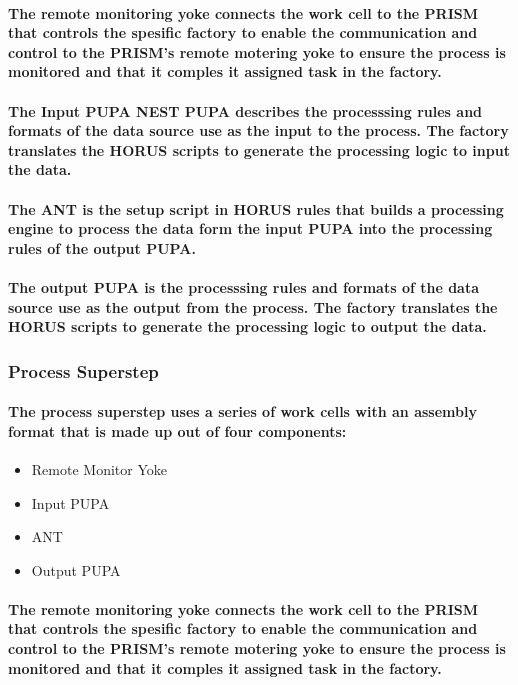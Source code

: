 \documentclass{acm_proc_article-sp}
\begin{document}
\paragraph{The remote monitoring yoke connects the work cell to the PRISM that controls the spesific factory to enable the communication and control to the PRISM's remote motering yoke to ensure the process is monitored and that it comples it assigned task in the factory.}
\paragraph{The Input PUPA NEST PUPA describes the processsing rules and formats of the data source use as the input to the process. The factory translates the HORUS scripts to generate the processing logic to input the data.}
\paragraph{The ANT is the setup script in HORUS rules that builds a processing engine to process the data form the input PUPA into the processing rules of the output PUPA. }
\paragraph{The output PUPA is the processsing rules and formats of the data source use as the output from the process. The factory translates the HORUS scripts to generate the processing logic to output the data.}
\subsubsection{Process Superstep}
\paragraph{The process superstep uses a series of work cells with an assembly format that is made up out of four components:}
\begin{itemize}
\item{Remote Monitor Yoke}
\item{Input PUPA}
\item{ANT}
\item{Output PUPA}
\end{itemize}
\paragraph{The remote monitoring yoke connects the work cell to the PRISM that controls the spesific factory to enable the communication and control to the PRISM's remote motering yoke to ensure the process is monitored and that it comples it assigned task in the factory.}
\end{document}
